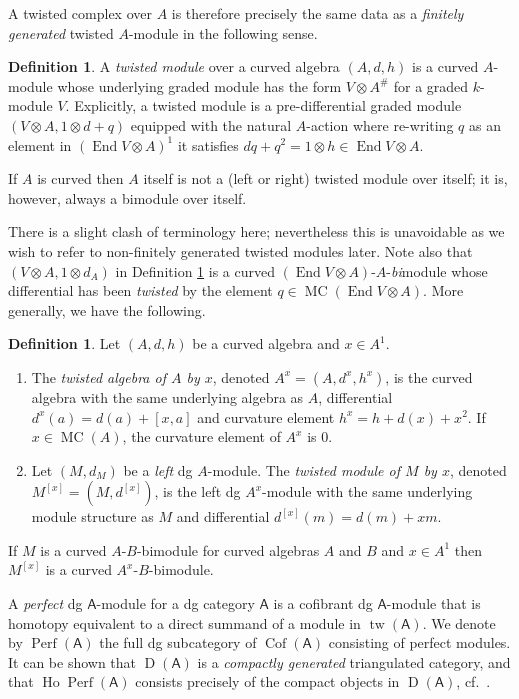 \documentclass[a4paper]{amsart}
\theoremstyle{plain}
\theoremstyle{definition}
\newtheorem{defn}[thm]{Definition}
\theoremstyle{remark}
\DeclareMathOperator{\Cof}{Cof}
\DeclareMathOperator{\D}{D}
\DeclareMathOperator{\End}{End}
\DeclareMathOperator{\Ho}{Ho}
\DeclareMathOperator{\MC}{MC}
\DeclareMathOperator{\Perf}{Perf}
\DeclareMathOperator{\tw}{tw}
\newcommand{\cat}[1]{\mathsf{#1}}
\numberwithin{equation}{section}
\theoremstyle{plain}
\begin{document}
	
	A twisted complex over $A$ is therefore precisely the same data as a \emph{finitely generated} twisted $A$-module in the following sense.
	
	
	\begin{defn}\label{twisted module}
		A \emph{twisted module} over a curved algebra $(A, d, h)$ is a curved $A$-module whose underlying graded module has the form $V \otimes A^\#$ for  a graded $k$-module $V$.
		Explicitly, a twisted module is a pre-differential graded module $(V \otimes A, 1 \otimes d + q)$ equipped with the natural $A$-action where  re-writing $q$ as an element in $(\End V \otimes A)^1$ it satisfies $dq+q^2 = 1 \otimes h \in \End V \otimes A$.	
	\end{defn}
If  $A$ is curved then $A$ itself is not a (left or right) twisted module over itself; it is, however, always a bimodule over itself.
	
	
	There is a slight clash of terminology here; nevertheless this is unavoidable as we wish to refer to non-finitely generated twisted modules later.
	Note also that $(V\otimes A, 1 \otimes d_A)$ in Definition \ref{twisted module} is a curved $(\End V \otimes A)$-$A$-\emph{bi}module whose differential has been \emph{twisted} by the element $q \in \MC(\End V \otimes A)$. 
	More generally, we have the following.
	
	\begin{defn}\label{def:twisted}
		Let $(A,d,h)$ be a curved algebra and $x \in A^1$.
		\begin{enumerate}
			\item The \emph{twisted algebra of $A$ by $x$}, denoted $A^x = (A,d^x,h^x)$, is the curved algebra with the same underlying algebra as $A$, differential $d^x(a) = d(a) + [x,a]$ and curvature element $h^x=h+d(x)+x^2$. If $x\in \MC(A)$, the curvature element of $A^x$ is $0$.
			\item Let $(M,d_M)$ be a \emph{left} dg $A$-module.
			The \emph{twisted module of $M$ by $x$}, denoted $M^{[x]} = (M,d^{[x]})$, is the left dg $A^x$-module with the same underlying module structure as $M$ and differential $d^{[x]} (m) = d(m) + xm$.
		\end{enumerate}
		 If $M$ is a curved $A$-$B$-bimodule for curved algebras $A$ and $B$ and $x\in A^1$ then $M^{[x]}$ is a curved $A^x$-$B$-bimodule. 
	\end{defn}
	
	A \emph{perfect} dg $\cat{A}$-module for a dg category $\cat{A}$ is a cofibrant dg $\cat{A}$-module that is homotopy equivalent to a direct summand of a module in $\tw(\cat{A})$.
	We denote by $\Perf(\cat{A})$ the full dg subcategory of $\Cof(\cat{A})$ consisting of perfect modules.
	It can be shown that $\D(\cat{A})$ is a \emph{compactly generated} triangulated category, and that $\Ho \Perf(\cat{A})$ consists precisely of the compact objects in $\D(\cat{A})$, cf.\ \cite{Toen07a}. 
	
\end{document}
